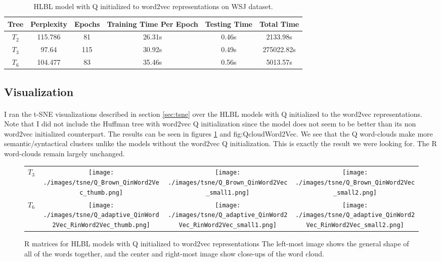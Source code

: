 \begin{table*} \centering
{}
\begin{tabular}{cccccc}\toprule
Tree & Perplexity & Epochs & Training Time Per Epoch & Testing Time & Total Time\\ 
\midrule
$T_2$ & 115.786 & 81 & 26.31s &0.46s & 2133.98s \\
$T_3$ & 97.64 & 115& 30.92s & 0.49s& 275022.82s\\
$T_6$& 104.477 & 83& 35.46s & 0.56s& 5013.57s\\
\bottomrule
\end{tabular}
\caption{HLBL model with Q initialized to word2vec representations on WSJ dataset.}
\label{tab:brownWord2vec}
\end{table*}

\subsection{Visualization}
\paragraph{}
I ran the t-SNE visualizations described in section \ref{sec:tsne} over the HLBL models with Q initialized to the word2vec representations. Note that I did not include the Huffman tree with word2vec Q initialization since the model does not seem to be better than its non word2vec initialized counterpart. The results can be seen in figures \ref{fig:RcloudWord2Vec} and {fig:QcloudWord2Vec}. We see that the Q word-clouds make more semantic/syntactical clusters unlike the models without the word2vec Q initialization. This is exactly the result we were looking for. The R word-clouds remain largely unchanged. 

\begin{figure}[p]
\centering
\begin{tabular}{@{}C{2cm}ccc@{}}
$T_3$&
\texttt{[image: ./images/tsne/Q\_Brown\_QinWord2Vec\_thumb.png]} &
\texttt{[image: ./images/tsne/Q\_Brown\_QinWord2Vec\_small1.png]} &
\texttt{[image: ./images/tsne/Q\_Brown\_QinWord2Vec\_small2.png]}
\\
$T_6$ &
\texttt{[image: ./images/tsne/Q\_adaptive\_QinWord2Vec\_RinWord2Vec\_thumb.png]} &
\texttt{[image: ./images/tsne/Q\_adaptive\_QinWord2Vec\_RinWord2Vec\_small1.png]} &
\texttt{[image: ./images/tsne/Q\_adaptive\_QinWord2Vec\_RinWord2Vec\_small2.png]}
\end{tabular}
\caption{R matrices for HLBL models with Q initialized to word2vec representations The left-most image shows the general shape of all of the words together, and the center and right-most image show close-ups of the word cloud.}
\label{fig:RcloudWord2Vec}
\end{figure}

